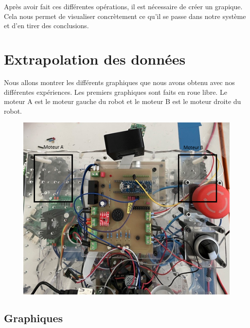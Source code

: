 \documentclass[
	a4paper,									%
	11pt,										%
	twoside,									%
	openright,									%
	notitlepage,									%
	parskip=half,								%
]{scrreprt}										%
\begin{document}
Après avoir fait ces différentes opérations, il est nécessaire de créer un grapique. Cela nous permet de visualiser concrètement ce qu'il 
se passe dans notre système et d'en tirer des conclusions. \par

\chapter{Extrapolation des données}

Nous allons montrer les différents graphiques que nous avons obtenu avec nos différentes expériences. Les premiers 
graphiques sont faits en roue libre. Le moteur A est le moteur gauche du robot et le moteur B est le moteur droite 
du robot. \par

\begin{figure}[!ht]
	\centering
	\includegraphics[scale=.8]{img/Haut_Robot.png}
	\vspace{.5cm}
	\label{img:img2}
\end{figure}


\section{Graphiques}
\end{document}
